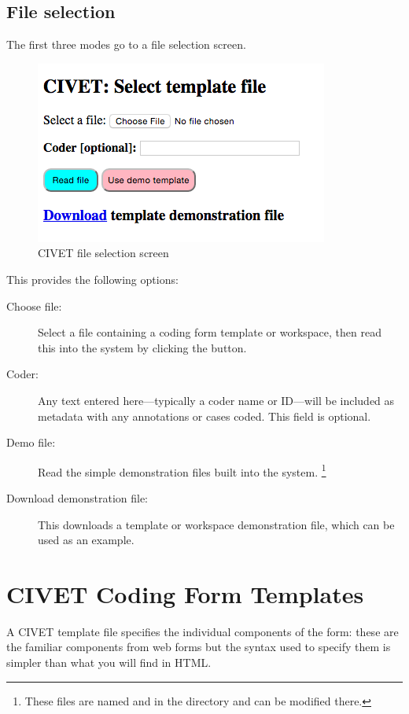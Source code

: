\documentclass[letterpaper,10pt,english]{sphinxmanual}
\begin{document}
\section{File selection}
\label{homepage:file-selection}
The first three modes go to a file selection screen.
\begin{figure}[htbp]
\centering
\capstart

\includegraphics{fileselect.png}
\caption{CIVET file selection screen}\end{figure}

This provides the following options:
\begin{description}
\item[{Choose file:}] \leavevmode
Select a file containing a coding form template or workspace, then
read this into the system by clicking the  button.

\item[{Coder:}] \leavevmode
Any text entered here—typically a coder name or ID—will be included
as metadata with any annotations or cases coded. This field is
optional.

\item[{Demo file:}] \leavevmode
Read the simple demonstration files built into the system. \footnote{
These files are named  and
 in the directory
 and can be modified
there.
}

\item[{Download demonstration file:}] \leavevmode
This downloads a template or workspace demonstration file, which can
be used as an example.

\end{description}


\chapter{CIVET Coding Form Templates}
\label{forms:sec-forms}\label{forms:civet-coding-form-templates}\label{forms::doc}
A CIVET template file specifies the individual components of the form:
these are the familiar components from web forms but the syntax used to
specify them is simpler than what you will find in HTML.
\end{document}
